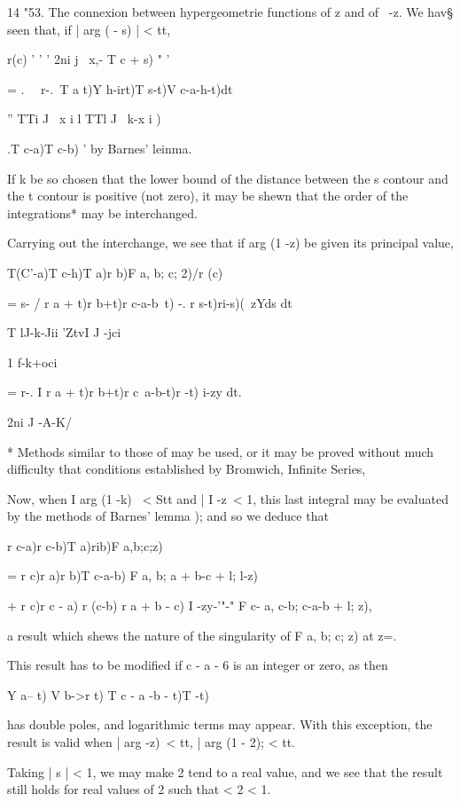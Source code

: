 14 "53. The connexion between hypergeometrie functions of z and of \
-z. We hav§ seen that, if | arg ( - s) | < tt,

r(c) ' ' ' 2ni j \ x,- T c + s) " '

= . \ \ r-.\ T a t)Y h-irt)T s-t)V c-a-h-t)dt\

'' TTi J \ x i l TTl J ~k-x i )

.T c-a)T c-b) ' by Barnes' leinma.

If k be so chosen that the lower bound of the distance between the s
contour and the t contour is positive (not zero), it may be shewn that
the order of the integrations* may be interchanged.

Carrying out the interchange, we see that if arg (1 -z) be given its
principal value,

T(C'-a)T c-h)T a)r b)F a, b; c; 2)/r (c)

= s- / r a + t)r b+t)r c-a-b~t) -. r s-t)ri-s)(~zYds dt

 T lJ-k-Jii 'ZtvI J -jci

1 f-k+oci

= r-. I r a + t)r b+t)r c~a-b-t)r -t) i-zy dt.

2ni J -A-K/

* Methods similar to those of may be used, or it may be proved
without much difficulty that conditions established by Bromwich,
Infinite Series, %

%
%

Now, when I arg (1 -k) \ < Stt and | I -z\ < 1, this last integral may
be evaluated by the methods of Barnes' lemma ); and so we
deduce that

r c-a)r c-b)T a)rib)F a,b;c;z)

= r c)r a)r b)T c-a-b) F a, b; a + b-c + l; l-z)

+ r c)r c - a) r (c-b) r a + b - c) I -zy-'"-" F c- a, c-b; c-a-b + l;
z),

a result which shews the nature of the singularity of F a, b; c; z)
at z=.

This result has to be modified if c - a - 6 is an integer or zero, as
then

Y a-- t) V b->r t) T c - a -b - t)T -t)

has double poles, and logarithmic terms may appear. With this
exception, the result is valid when | arg -z)\ < tt, | arg (1 - 2); <
tt.

Taking | s | < 1, we may make 2 tend to a real value, and we see that
the result still holds for real values of 2 such that < 2 < 1.


